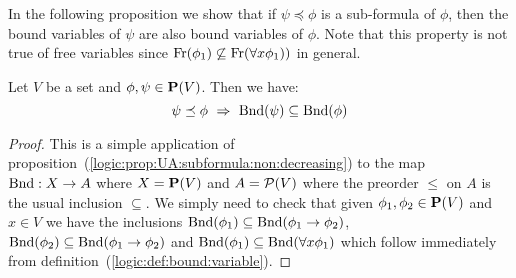 In the following proposition we show that if $\psi\preceq\phi$ is a
sub-formula of $\phi$, then the bound variables of $\psi$ are also
bound variables of $\phi$. Note that this property is not true of
free variables since $\mbox{\rm Fr}(\phi_{1})\not\subseteq\mbox{\rm Fr}(\forall
x\phi_{1}))$ in general.

\begin{prop}\label{logic:prop:FOPL:boundvar:subformula}
Let $V$ be a set and $\phi,\psi\in\mbox{${\bf P}(V)$}$. Then we have:
    \[
    \psi\preceq\phi\ \Rightarrow\ \bound(\psi)\subseteq\bound(\phi)
    \]
\end{prop}
\begin{proof}
This is a simple application of
proposition~(\ref{logic:prop:UA:subformula:non:decreasing}) to the
map $\mbox{\rm Bnd}:X\to A$ where $X=\mbox{${\bf P}(V)$}$ and $A={\cal P}(V)$ where the
preorder $\leq$ on $A$ is the usual inclusion $\subseteq$. We simply
need to check that given $\phi_{1},\phi_{2}\in\mbox{${\bf P}(V)$}$ and $x\in V$ we
have the inclusions
$\mbox{\rm Bnd}(\phi_{1})\subseteq\mbox{\rm Bnd}(\phi_{1}\to\phi_{2})$,
$\mbox{\rm Bnd}(\phi_{2})\subseteq\mbox{\rm Bnd}(\phi_{1}\to\phi_{2})$ and
$\mbox{\rm Bnd}(\phi_{1})\subseteq\mbox{\rm Bnd}(\forall x\phi_{1})$ which follow
immediately from definition~(\ref{logic:def:bound:variable}).
\end{proof}

